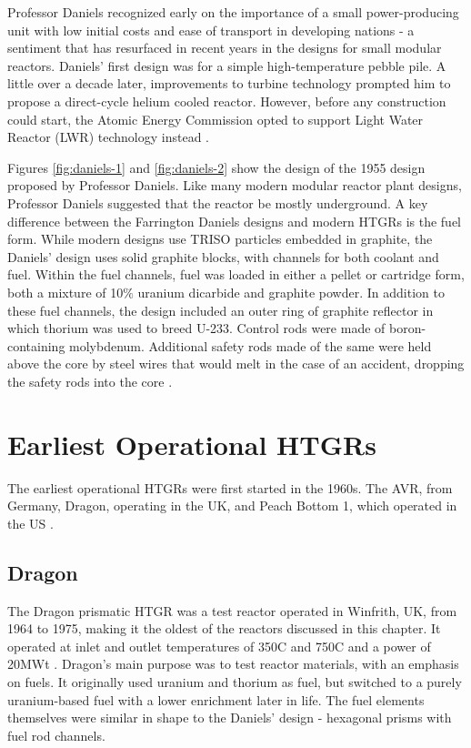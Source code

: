 Professor Daniels recognized early on the importance of a small power-producing unit with low initial costs and ease of transport in developing nations - a sentiment that has resurfaced in recent years in the designs for small modular reactors.  Daniels' first design was for a simple high-temperature pebble pile.  A little over a decade later, improvements to turbine technology prompted him to propose a direct-cycle helium cooled reactor.  However, before any construction could start, the Atomic Energy Commission opted to support Light Water Reactor (LWR) technology instead \cite{simnad_early_1991}.




Figures \ref{fig:daniels-1} and \ref{fig:daniels-2} show the design of the 1955 design proposed by Professor Daniels.  Like many modern modular reactor plant designs, Professor Daniels suggested that the reactor be mostly underground.  A key difference between the Farrington Daniels designs and modern HTGRs is the fuel form.  While modern designs use TRISO particles embedded in graphite, the Daniels' design uses solid graphite blocks, with channels for both coolant and fuel.  Within the fuel channels, fuel was loaded in either a pellet or cartridge form, both a mixture of 10$\%$ uranium dicarbide and graphite powder.  In addition to these fuel channels, the design included an outer ring of graphite reflector in which thorium was used to breed U-233.  Control rods were made of boron-containing molybdenum.  Additional safety rods made of the same were held above the core by steel wires that would melt in the case of an accident, dropping the safety rods into the core \cite{simnad_early_1991}.

\section{Earliest Operational HTGRs}

The earliest operational HTGRs were first started in the 1960s.  The AVR, from Germany, Dragon, operating in the UK, and Peach Bottom 1, which operated in the US \cite{beck_high_nodate}.

\subsection{Dragon}

The Dragon prismatic HTGR was a test reactor operated in Winfrith, UK, from 1964 to 1975, making it the oldest of the reactors discussed in this chapter.  It operated at inlet and outlet temperatures of 350\textdegree  C and 750\textdegree  C and a power of 20MWt \cite{beck_high_nodate}.  Dragon's main purpose was to test reactor materials, with an emphasis on fuels.  It originally used uranium and thorium as fuel, but switched to a purely uranium-based fuel with a lower enrichment later in life.  The fuel elements themselves were similar in shape to the Daniels' design - hexagonal prisms with fuel rod channels.

